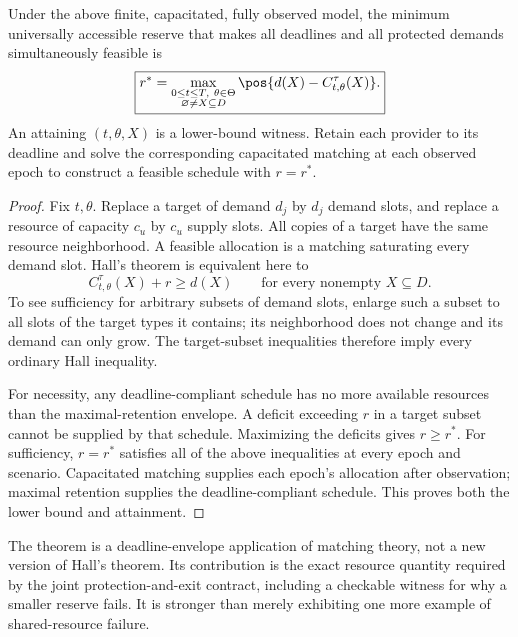 \begin{theorem}
\label{thm:reserve}
Under the above finite, capacitated, fully observed model, the minimum universally accessible reserve that makes all deadlines and all protected demands simultaneously feasible is
\begin{equation}
\boxed{\displaystyle
r^*=\max_{\substack{0\leq t\leq T,\ \theta\in\Theta\\ \varnothing\neq X\subseteq D}}
\pos{d(X)-C^{\tau}_{t,\theta}(X)}.}
\label{eq:reserve}
\end{equation}
An attaining $(t,\theta,X)$ is a lower-bound witness. Retain each provider to its deadline and solve the corresponding capacitated matching at each observed epoch to construct a feasible schedule with $r=r^*$.
\end{theorem}
\begin{proof}
Fix $t,\theta$. Replace a target of demand $d_j$ by $d_j$ demand slots, and replace a resource of capacity $c_u$ by $c_u$ supply slots. All copies of a target have the same resource neighborhood. A feasible allocation is a matching saturating every demand slot. Hall's theorem \cite{hall} is equivalent here to
\[
C^{\tau}_{t,\theta}(X)+r\geq d(X)\qquad\text{for every nonempty }X\subseteq D.
\]
To see sufficiency for arbitrary subsets of demand slots, enlarge such a subset to all slots of the target types it contains; its neighborhood does not change and its demand can only grow. The target-subset inequalities therefore imply every ordinary Hall inequality.

For necessity, any deadline-compliant schedule has no more available resources than the maximal-retention envelope. A deficit exceeding $r$ in a target subset cannot be supplied by that schedule. Maximizing the deficits gives $r\geq r^*$. For sufficiency, $r=r^*$ satisfies all of the above inequalities at every epoch and scenario. Capacitated matching supplies each epoch's allocation after observation; maximal retention supplies the deadline-compliant schedule. This proves both the lower bound and attainment.
\end{proof}
The theorem is a deadline-envelope application of matching theory, not a new version of Hall's theorem. Its contribution is the exact resource quantity required by the joint protection-and-exit contract, including a checkable witness for why a smaller reserve fails. It is stronger than merely exhibiting one more example of shared-resource failure.

